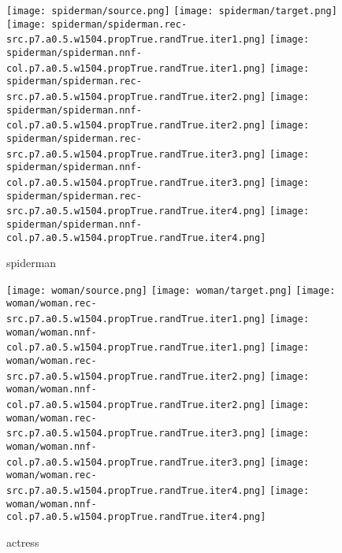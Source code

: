 \documentclass{article}
\begin{document}
\begin{figure}[H]
\centering
\texttt{[image: spiderman/source.png]}\enskip
\texttt{[image: spiderman/target.png]}
\texttt{[image: spiderman/spiderman.rec-src.p7.a0.5.w1504.propTrue.randTrue.iter1.png]}\enskip
\texttt{[image: spiderman/spiderman.nnf-col.p7.a0.5.w1504.propTrue.randTrue.iter1.png]}
\texttt{[image: spiderman/spiderman.rec-src.p7.a0.5.w1504.propTrue.randTrue.iter2.png]}\enskip
\texttt{[image: spiderman/spiderman.nnf-col.p7.a0.5.w1504.propTrue.randTrue.iter2.png]}
\texttt{[image: spiderman/spiderman.rec-src.p7.a0.5.w1504.propTrue.randTrue.iter3.png]}\enskip
\texttt{[image: spiderman/spiderman.nnf-col.p7.a0.5.w1504.propTrue.randTrue.iter3.png]}
\texttt{[image: spiderman/spiderman.rec-src.p7.a0.5.w1504.propTrue.randTrue.iter4.png]}\enskip
\texttt{[image: spiderman/spiderman.nnf-col.p7.a0.5.w1504.propTrue.randTrue.iter4.png]}
\caption{spiderman}
\end{figure}

\begin{figure}[H]
\centering
\texttt{[image: woman/source.png]}\enskip
\texttt{[image: woman/target.png]}
\texttt{[image: woman/woman.rec-src.p7.a0.5.w1504.propTrue.randTrue.iter1.png]}\enskip
\texttt{[image: woman/woman.nnf-col.p7.a0.5.w1504.propTrue.randTrue.iter1.png]}
\texttt{[image: woman/woman.rec-src.p7.a0.5.w1504.propTrue.randTrue.iter2.png]}\enskip
\texttt{[image: woman/woman.nnf-col.p7.a0.5.w1504.propTrue.randTrue.iter2.png]}
\texttt{[image: woman/woman.rec-src.p7.a0.5.w1504.propTrue.randTrue.iter3.png]}\enskip
\texttt{[image: woman/woman.nnf-col.p7.a0.5.w1504.propTrue.randTrue.iter3.png]}
\texttt{[image: woman/woman.rec-src.p7.a0.5.w1504.propTrue.randTrue.iter4.png]}\enskip
\texttt{[image: woman/woman.nnf-col.p7.a0.5.w1504.propTrue.randTrue.iter4.png]}
\caption{actress}
\end{figure}
\end{document}
